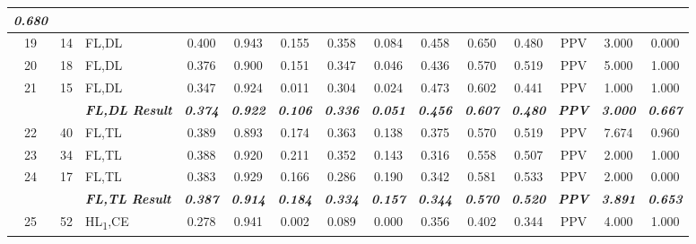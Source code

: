 \begin{table}[H]
{\begin{tabular}{cc|l|c|c|c|c|c|c|c|c|c|c|c|}
    \textit{\textbf{0.680}} \\ \hline
  \multicolumn{1}{|c|}{19} &
    14 &
    FL,DL &
    0.400 &
    0.943 &
    0.155 &
    0.358 &
    0.084 &
    0.458 &
    0.650 &
    0.480 &
    PPV &
    3.000 &
    0.000 \\ \hline
  \multicolumn{1}{|c|}{20} &
    18 &
    FL,DL &
    0.376 &
    0.900 &
    0.151 &
    0.347 &
    0.046 &
    0.436 &
    0.570 &
    0.519 &
    PPV &
    5.000 &
    1.000 \\ \hline
  \multicolumn{1}{|c|}{21} &
    15 &
    FL,DL &
    0.347 &
    0.924 &
    0.011 &
    0.304 &
    0.024 &
    0.473 &
    0.602 &
    0.441 &
    PPV &
    1.000 &
    1.000 \\ \hline
  \textit{\textbf{}} &
    \textit{\textbf{}} &
    \textit{\textbf{FL,DL Result}} &
    \textit{\textbf{0.374}} &
    \textit{\textbf{0.922}} &
    \textit{\textbf{0.106}} &
    \textit{\textbf{0.336}} &
    \textit{\textbf{0.051}} &
    \textit{\textbf{0.456}} &
    \textit{\textbf{0.607}} &
    \textit{\textbf{0.480}} &
    \textit{\textbf{PPV}} &
    \textit{\textbf{3.000}} &
    \textit{\textbf{0.667}} \\ \hline
  \multicolumn{1}{|c|}{22} &
    40 &
    FL,TL &
    0.389 &
    0.893 &
    0.174 &
    0.363 &
    0.138 &
    0.375 &
    0.570 &
    0.519 &
    PPV &
    7.674 &
    0.960 \\ \hline
  \multicolumn{1}{|c|}{23} &
    34 &
    FL,TL &
    0.388 &
    0.920 &
    0.211 &
    0.352 &
    0.143 &
    0.316 &
    0.558 &
    0.507 &
    PPV &
    2.000 &
    1.000 \\ \hline
  \multicolumn{1}{|c|}{24} &
    17 &
    FL,TL &
    0.383 &
    0.929 &
    0.166 &
    0.286 &
    0.190 &
    0.342 &
    0.581 &
    0.533 &
    PPV &
    2.000 &
    0.000 \\ \hline
  \textit{\textbf{}} &
    \textit{\textbf{}} &
    \textit{\textbf{FL,TL Result}} &
    \textit{\textbf{0.387}} &
    \textit{\textbf{0.914}} &
    \textit{\textbf{0.184}} &
    \textit{\textbf{0.334}} &
    \textit{\textbf{0.157}} &
    \textit{\textbf{0.344}} &
    \textit{\textbf{0.570}} &
    \textit{\textbf{0.520}} &
    \textit{\textbf{PPV}} &
    \textit{\textbf{3.891}} &
    \textit{\textbf{0.653}} \\ \hline
  \multicolumn{1}{|c|}{25} &
    52 &
    HL\textsubscript{1},CE &
    0.278 &
    0.941 &
    0.002 &
    0.089 &
    0.000 &
    0.356 &
    0.402 &
    0.344 &
    PPV &
    4.000 &
    1.000 \\ \hline

\end{tabular}}
\end{table}
